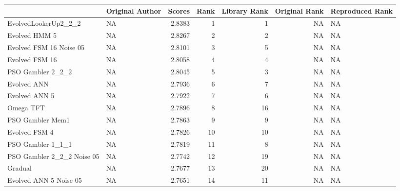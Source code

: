 \begin{tabular}{llrrrrl}
\toprule
{} &                     Original Author &  Scores &  Rank &  Library Rank &  Original Rank & Reproduced Rank \\
\midrule
EvolvedLookerUp2\_2\_2       &                                  NA &  2.8383 &     1 &             1 &             NA &              NA \\
Evolved HMM 5              &                                  NA &  2.8267 &     2 &             2 &             NA &              NA \\
Evolved FSM 16 Noise 05    &                                  NA &  2.8101 &     3 &             5 &             NA &              NA \\
Evolved FSM 16             &                                  NA &  2.8058 &     4 &             4 &             NA &              NA \\
PSO Gambler 2\_2\_2          &                                  NA &  2.8045 &     5 &             3 &             NA &              NA \\
Evolved ANN                &                                  NA &  2.7936 &     6 &             7 &             NA &              NA \\
Evolved ANN 5              &                                  NA &  2.7922 &     7 &             6 &             NA &              NA \\
Omega TFT                  &                                  NA &  2.7896 &     8 &            16 &             NA &              NA \\
PSO Gambler Mem1           &                                  NA &  2.7863 &     9 &             9 &             NA &              NA \\
Evolved FSM 4              &                                  NA &  2.7826 &    10 &            10 &             NA &              NA \\
PSO Gambler 1\_1\_1          &                                  NA &  2.7819 &    11 &             8 &             NA &              NA \\
PSO Gambler 2\_2\_2 Noise 05 &                                  NA &  2.7742 &    12 &            19 &             NA &              NA \\
Gradual                    &                                  NA &  2.7677 &    13 &            20 &             NA &              NA \\
Evolved ANN 5 Noise 05     &                                  NA &  2.7651 &    14 &            11 &             NA &              NA \\

\end{tabular}
